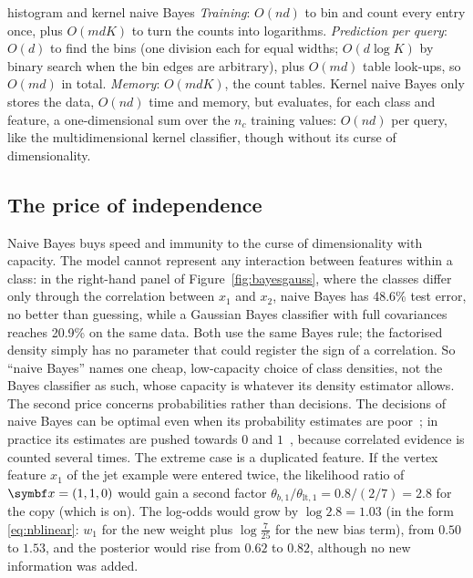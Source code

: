 \documentclass[11pt]{article}
\begin{document}
\begin{runtime}{histogram and kernel naive Bayes}
\emph{Training}: $O(nd)$ to bin and count every entry once, plus $O(mdK)$ to turn the counts into logarithms.
\emph{Prediction per query}: $O(d)$ to find the bins (one division each for equal widths; $O(d \log K)$ by binary
search when the bin edges are arbitrary), plus $O(md)$ table look-ups, so $O(md)$ in total. \emph{Memory}: $O(mdK)$,
the count tables. Kernel naive Bayes only stores the data, $O(nd)$ time and memory, but evaluates, for each
class and feature, a one-dimensional sum over the $n_c$ training values: $O(nd)$ per query, like the
multidimensional kernel classifier, though without its curse of dimensionality.
\end{runtime}

\subsection{The price of independence}

Naive Bayes buys speed and immunity to the curse of dimensionality with capacity. The model cannot represent any
interaction between features within a class: in the right-hand panel of Figure~\ref{fig:bayesgauss}, where the classes
differ only through the correlation between $x_1$ and $x_2$, naive Bayes has 48.6\% test error, no better than
guessing, while a Gaussian Bayes classifier with full covariances reaches 20.9\% on the same data. Both use the same
Bayes rule; the factorised density simply has no parameter that could register the sign of a correlation. So ``naive
Bayes'' names one cheap, low-capacity choice of class densities, not the Bayes classifier as such, whose capacity is
whatever its density estimator allows. The second price concerns probabilities rather than decisions. The decisions of naive Bayes can be
optimal even when its probability estimates are poor~\cite{domingos1997}; in practice its estimates are pushed towards
$0$ and $1$~\cite{niculescu2005}, because correlated evidence is counted several times. The extreme case is a
duplicated feature. If the vertex feature $x_1$ of the jet example
were entered twice, the likelihood ratio of $\x = (1, 1, 0)$ would gain a second factor
$\theta_{b,1}/\theta_{\mathrm{lt},1} = 0.8/(2/7) = 2.8$ for the copy (which is on). The log-odds would grow by
$\log 2.8 = 1.03$ (in the form \eqref{eq:nblinear}: $w_1$ for the new weight plus $\log\tfrac{7}{25}$ for the new bias
term), from $0.50$ to $1.53$, and the posterior would rise from $0.62$ to $0.82$, although no new information was
added.
\end{document}

